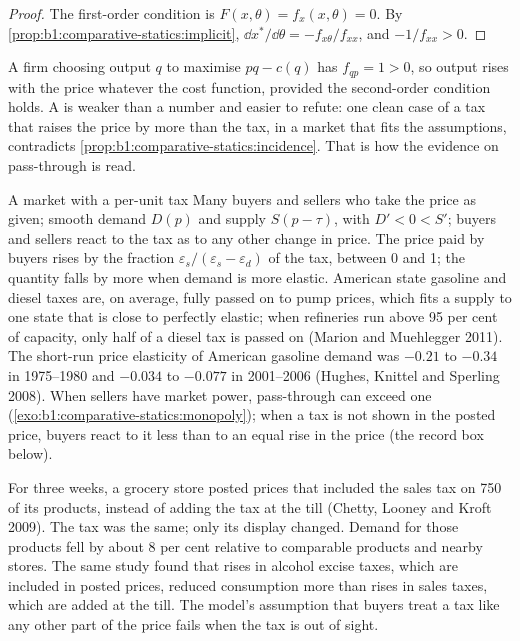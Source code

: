 \begin{proof}
The first-order condition is $F(x, \theta) = f_x(x, \theta) = 0$. By
\cref{prop:b1:comparative-statics:implicit}, $\dd x^*/\dd\theta =
-f_{x\theta}/f_{xx}$, and $-1/f_{xx} > 0$.
\end{proof}

A firm choosing output $q$ to maximise $pq - c(q)$ has $f_{qp} = 1 > 0$, so
output rises with the price whatever the cost function, provided the
second-order condition holds. A  is weaker than a number and
easier to refute: one clean case of a tax that raises the price by more
than the tax, in a market that fits the assumptions, contradicts
\cref{prop:b1:comparative-statics:incidence}. That is how the evidence on
pass-through is read.

\begin{model}{A market with a per-unit tax}
\assumes Many buyers and sellers who take the price as given; smooth demand
$D(p)$ and supply $S(p - \tau)$, with $D' < 0 < S'$; buyers and sellers react
to the tax as to any other change in price.
\predicts The price paid by buyers rises by the fraction
$\varepsilon_s/(\varepsilon_s - \varepsilon_d)$ of the tax, between 0 and 1;
the quantity falls by more when demand is more elastic.
\tested American state gasoline and diesel taxes are, on average, fully
passed on to pump prices, which fits a supply to one state that is close to
perfectly elastic; when refineries run above 95 per cent of capacity, only
half of a diesel tax is passed on (Marion and Muehlegger 2011). %
The short-run price elasticity of American gasoline demand was $-0.21$ to
$-0.34$ in 1975--1980 and $-0.034$ to $-0.077$ in 2001--2006 (Hughes,
Knittel and Sperling 2008). %
\breaks When sellers have market power, pass-through can exceed one
(\cref{exo:b1:comparative-statics:monopoly}); when a tax is not shown in the
posted price, buyers react to it less than to an equal rise in the price
(the record box below).
\end{model}

\begin{record}[Salience]
For three weeks, a grocery store posted prices that included the sales tax
on 750 of its products, instead of adding the tax at the till (Chetty,
Looney and Kroft 2009). %
The tax was the same; only its display changed. Demand for those products
fell by about 8 per cent relative to comparable products and nearby stores. %
The same study found that rises in alcohol excise taxes, which are included
in posted prices, reduced consumption more than rises in sales taxes, which
are added at the till. The model's assumption that buyers treat a tax like
any other part of the price fails when the tax is out of sight.
\end{record}

